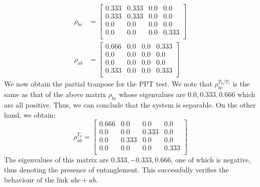 \documentclass{scrartcl}
\begin{document}
            \begin{align}
                \rho_{bc} &=
                \left[
                \begin{array}{cccc}
                0.333 & 0.333 & 0.0 & 0.0 \\
                0.333 & 0.333 & 0.0 & 0.0 \\
                0.0 & 0.0 & 0.0 & 0.0 \\
                0.0 & 0.0 & 0.0 & 0.333 \\
                \end{array}
                \right]\\
                \rho_{ab} &=
                    \left[
                    \begin{array}{cccc}
                    0.666 & 0.0 & 0.0 & 0.333 \\
                    0.0 & 0.0 & 0.0 & 0.0 \\
                    0.0 & 0.0 & 0.0 & 0.0 \\
                    0.333 & 0.0 & 0.0 & 0.333 \\
                    \end{array}
                    \right]
                    \end{align}
                   We now obtain the partial tranpose for the PPT test. We note that $\rho_{bc}^{T_b/T_c}$ is the same as that of the above matrix $\rho_{bc}$ whose eigenvalues are $0.0, 0.333, 0.666$ which are all positive. Thus, we can conclude that the system is separable. On the other hand, we obtain:
                   \begin{equation}
                    \rho_{ab}^{T_a} =
                    \left[
                    \begin{array}{cccc}
                    0.666 & 0.0 & 0.0 & 0.0 \\
                    0.0 & 0.0 & 0.333 & 0.0 \\
                    0.0 & 0.333 & 0.0 & 0.0 \\
                    0.0 & 0.0 & 0.0 & 0.333 \\
                    \end{array}
                    \right]
                    \end{equation}
                    The eigenvalues of this matrix are $0.333, -0.333, 0.666$, one of which is negative, thus denoting the presence of entanglement. This successfully verifies the behaviour of the link $abc+ab$. \\[0.3cm]
\end{document}
